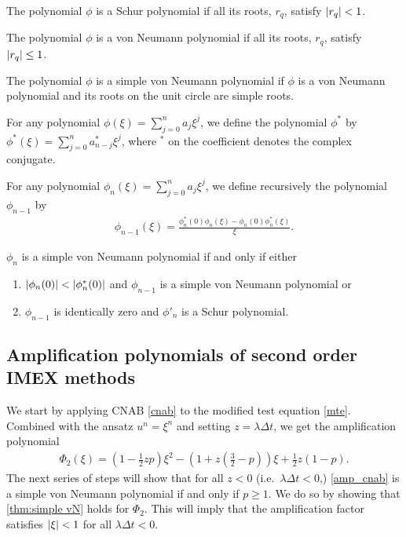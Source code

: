 \begin{definition}
	The polynomial $\phi$ is a Schur polynomial if all its roots, $r_q$, satisfy $\left|r_q\right| < 1$.
\end{definition}
\begin{definition}
        The polynomial $\phi$ is a von Neumann polynomial if all its roots, $r_q$, satisfy $\left|r_q\right|\leq 1$.
\end{definition}
\begin{definition}
	The polynomial $\phi$ is a simple von Neumann polynomial if $\phi$ is a von Neumann polynomial and its roots on the unit circle are simple roots.
\end{definition}
\begin{definition}
	For any polynomial $\phi(\xi) = \sum^n_{j=0} a_j\xi^j$, we define the polynomial $\phi^*$ by $\phi^*(\xi) = \sum^n_{j=0} a^*_{n-j} \xi^j$, where $^*$ on the coefficient denotes the complex conjugate.
\label{defn:conj}
\end{definition}
\begin{definition}
	For any polynomial $\phi_n(\xi) = \sum^n_{j=0} a_j\xi^j$, we define recursively the polynomial $\phi_{n-1}$ by
	\begin{align}
	\phi_{n-1}(\xi) = \frac{\phi_n^*(0)\phi_n(\xi) - \phi_n(0)\phi_n^*(\xi)}{\xi}.
	\end{align} 
\label{defn:recurse}
\end{definition}
\begin{theorem}
	$\phi_n$ is a simple von Neumann polynomial if and only if either 
	\begin{enumerate}[label=(\alph{*})]
		\item $\left|\phi_n(0)\right| < \left|\phi^*_n(0)\right|$ and $\phi_{n-1}$ is a simple von Neumann polynomial or
		
		\item $\phi_{n-1}$ is identically zero and $\phi'_{n}$ is a Schur polynomial.
	\end{enumerate}
\label{thm:simple vN}
\end{theorem}

\subsection{Amplification polynomials of second order IMEX methods}
We start by applying CNAB \eqref{cnab} to the modified test equation \eqref{mte}. Combined with the ansatz $u^n = \xi^n$ and setting $z=\lambda\Delta t$, we get the amplification polynomial
\begin{align}
\Phi_2(\xi) 
= \left(1 - \frac{1}{2}zp\right)\xi^2
- \left(1 + z\left(\frac{3}{2}-p \right)\right)\xi + \frac{1}{2}z(1-p).
\label{amp_cnab}
\end{align}
The next series of steps will show that for all $z<0$ (i.e.\ $\lambda\Delta t < 0$,) \eqref{amp_cnab} is a simple von Neumann polynomial if and only if $p\geq 1$. We do so by showing that \cref{thm:simple vN} holds for $\Phi_2$. This will imply that the amplification factor satisfies $\left|\xi\right| < 1$ for all $\lambda\Delta t<0$. 

